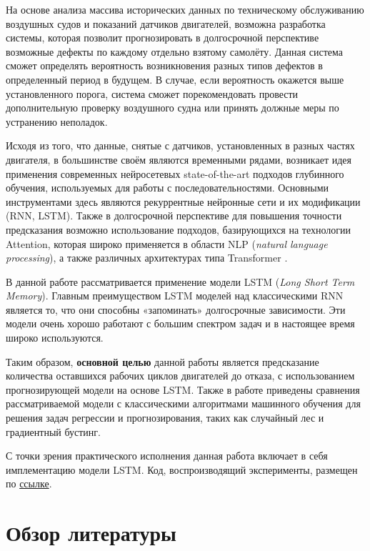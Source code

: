\documentclass[14pt]{extarticle}
\begin{document}
На основе анализа массива исторических данных по техническому обслуживанию воздушных судов и показаний датчиков двигателей, возможна разработка системы, которая позволит прогнозировать в долгосрочной перспективе возможные дефекты по каждому отдельно взятому самолёту. Данная система сможет определять вероятность возникновения разных типов дефектов в определенный период в будущем. В случае, если вероятность окажется выше установленного порога, система сможет порекомендовать провести дополнительную проверку воздушного судна или принять должные меры по устранению неполадок.

Исходя из того, что данные, снятые с датчиков, установленных в разных частях двигателя, в большинстве своём являются временными рядами, возникает идея применения современных нейросетевых state-of-the-art подходов глубинного обучения, используемых для работы с последовательностями. Основными инструментами здесь являются рекуррентные нейронные сети и их модификации (RNN, LSTM). Также в долгосрочной перспективе для повышения точности предсказания возможно использование подходов, базирующихся на технологии Attention, которая широко применяется в области NLP ({\it natural language processing}), а также различных архитектурах типа Transformer \cite{46201}.

В данной работе рассматривается применение модели LSTM ({\it Long Short Term Memory}). Главным преимуществом LSTM моделей над классическими RNN является то, что они способны «запоминать» долгосрочные зависимости. Эти модели очень хорошо работают с большим спектром задач и в настоящее время широко используются.

Таким образом, {\bf основной целью} данной работы является предсказание количества оставшихся рабочих циклов двигателей до отказа, с использованием прогнозирующей модели на основе LSTM. Также в работе приведены сравнения рассматриваемой модели с классическими алгоритмами машинного обучения для решения задач регрессии и прогнозирования, таких как случайный лес и градиентный бустинг. 

С точки зрения практического исполнения данная работа включает в себя имплементацию модели LSTM. Код, воспроизводящий эксперименты, размещен по \href{https://github.com/teslyuk/bachelors-thesis}{ссылке}.

\newpage

\section{Обзор литературы}
\end{document}
